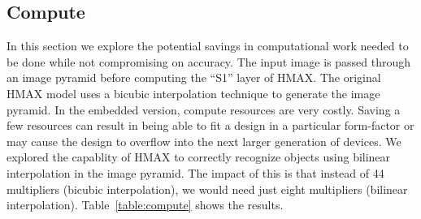 \subsection{Compute}
In this section we explore the potential savings in computational work needed to be done while not compromising on accuracy. The input image 
is passed through an image pyramid before computing the ``S1'' layer of HMAX. The original HMAX model uses a bicubic interpolation technique 
to generate the image pyramid. In the embedded version, compute resources are very costly. Saving a few resources can result in being able to 
fit a design in a particular form-factor or may cause the design to overflow into the next larger generation of devices. We explored the 
capablity of HMAX to correctly recognize objects using bilinear interpolation in the image pyramid. The impact of this is that instead of 
44 multipliers (bicubic interpolation), we would need just eight multipliers (bilinear interpolation). Table~\ref{table:compute} shows the 
results. 
